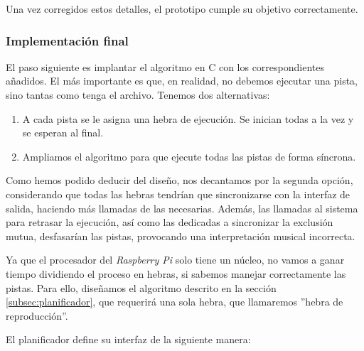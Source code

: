 Una vez corregidos estos detalles, el prototipo cumple su objetivo correctamente. 

\subsubsection{Implementación final}

El paso siguiente es implantar el algoritmo en C con los correspondientes añadidos. El más importante es que, en realidad, no debemos ejecutar una pista, sino tantas como tenga el archivo. Tenemos dos alternativas:

\begin{enumerate}
	\item A cada pista se le asigna una hebra de ejecución. Se inician todas a la vez y se esperan al final.
	\item Ampliamos el algoritmo para que ejecute todas las pistas de forma síncrona.
\end{enumerate}

Como hemos podido deducir del diseño, nos decantamos por la segunda opción, considerando que todas las hebras tendrían que sincronizarse con la interfaz de salida, haciendo más llamadas de las necesarias. Además, las llamadas al sistema para retrasar la ejecución, así como las dedicadas a sincronizar la exclusión mutua, desfasarían las pistas, provocando una interpretación musical incorrecta.

Ya que el procesador del \textit{Raspberry Pi} solo tiene un núcleo, no vamos a ganar tiempo dividiendo el proceso en hebras, si sabemos manejar correctamente las pistas. Para ello, diseñamos el algoritmo descrito en la sección \ref{subsec:planificador}, que requerirá una sola hebra, que llamaremos ''hebra de reproducción''.

El planificador define su interfaz de la siguiente manera:

